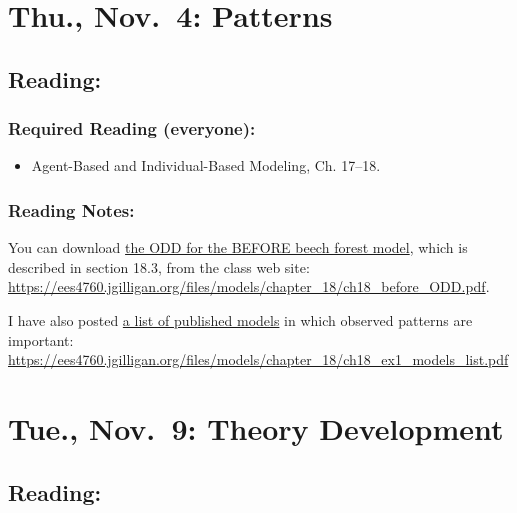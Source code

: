\documentclass[
]{article}
\providecommand{\tightlist}{%
  \setlength{\itemsep}{0pt}\setlength{\parskip}{0pt}}
\begin{document}
\hypertarget{thu.-nov.-4-patterns}{%
\section{Thu., Nov.~4: Patterns}\label{thu.-nov.-4-patterns}}

\hypertarget{reading-19}{%
\subsection{Reading:}\label{reading-19}}

\hypertarget{required-reading-everyone-16}{%
\subsubsection{Required Reading
(everyone):}\label{required-reading-everyone-16}}

\begin{itemize}
\tightlist
\item
  Agent-Based and Individual-Based Modeling, Ch. 17--18.
\end{itemize}

\hypertarget{reading-notes-13}{%
\subsubsection{Reading Notes:}\label{reading-notes-13}}

You can download \href{/files/models/chapter_18/ch18_before_ODD.pdf}{the
ODD for the BEFORE beech forest model}, which is described in section
18.3, from the class web site:
\url{https://ees4760.jgilligan.org/files/models/chapter_18/ch18_before_ODD.pdf}.

I have also posted
\href{/files/models/chapter_18/ch18_ex1_models_list.pdf}{a list of
published models} in which observed patterns are important:
\url{https://ees4760.jgilligan.org/files/models/chapter_18/ch18_ex1_models_list.pdf}

\hypertarget{tue.-nov.-9-theory-development}{%
\section{Tue., Nov.~9: Theory
Development}\label{tue.-nov.-9-theory-development}}

\hypertarget{reading-20}{%
\subsection{Reading:}\label{reading-20}}
\end{document}
